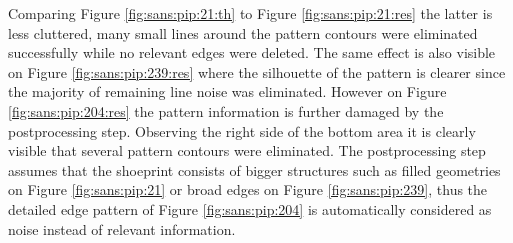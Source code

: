 \documentclass[draft,final]{vutinfth} %
\begin{document}
Comparing Figure \ref{fig:sans:pip:21:th} to  Figure \ref{fig:sans:pip:21:res} the latter is less cluttered, many small lines around the pattern contours were eliminated successfully while no relevant edges were deleted.
The same effect is also visible on Figure \ref{fig:sans:pip:239:res} where the silhouette of the pattern is clearer since the majority of remaining line noise was eliminated.
However on Figure \ref{fig:sans:pip:204:res} the pattern information is further damaged by the postprocessing step.
Observing the right side of the bottom area it is clearly visible that several pattern contours were eliminated.
The postprocessing step assumes that the shoeprint consists of bigger structures such as filled geometries on Figure \ref{fig:sans:pip:21} or broad edges on Figure \ref{fig:sans:pip:239}, thus the detailed edge pattern of Figure \ref{fig:sans:pip:204} is automatically considered as noise instead of relevant information.
\end{document}
